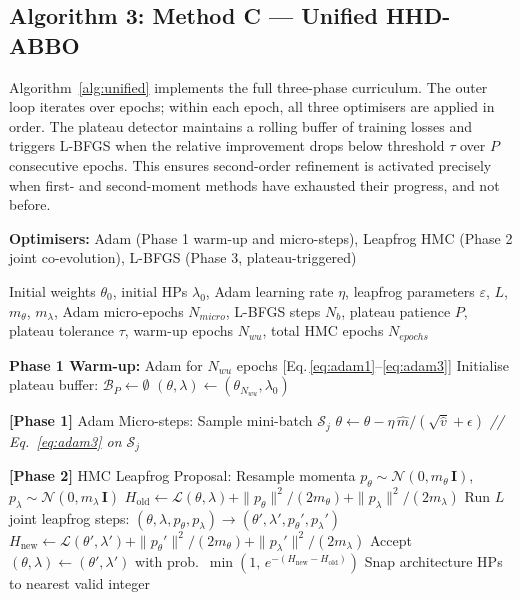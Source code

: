 \documentclass[12pt,a4paper]{article}
\begin{document}
\subsection{Algorithm 3: Method C — Unified HHD-ABBO}

Algorithm~\ref{alg:unified} implements the full three-phase curriculum.
The outer loop iterates over epochs; within each epoch, all three
optimisers are applied in order.  The plateau detector maintains a
rolling buffer of training losses and triggers L-BFGS when the relative
improvement drops below threshold $\tau$ over $P$ consecutive epochs.
This ensures second-order refinement is activated precisely when first-
and second-moment methods have exhausted their progress, and not before.

\begin{algorithm}[tb]
\caption{Method C — Unified HHD-ABBO}
\label{alg:unified}
\textbf{Optimisers:} Adam (Phase 1 warm-up and micro-steps),
Leapfrog HMC (Phase 2 joint co-evolution),
L-BFGS (Phase 3, plateau-triggered)
\begin{algorithmic}[1]
\Require Initial weights $\theta_0$, initial HPs $\lambda_0$,
         Adam learning rate $\eta$,
         leapfrog parameters $\varepsilon$, $L$, $m_\theta$, $m_\lambda$,
         Adam micro-epochs $N_{micro}$,
         L-BFGS steps $N_b$,
         plateau patience $P$,
         plateau tolerance $\tau$,
         warm-up epochs $N_{wu}$,
         total HMC epochs $N_{epochs}$

\State \textbf{Phase 1 Warm-up:} Adam for $N_{wu}$ epochs
       [Eq.\,\eqref{eq:adam1}--\eqref{eq:adam3}]
\State Initialise plateau buffer: $\mathcal{B}_P \leftarrow \emptyset$
\State $(\theta, \lambda) \leftarrow (\theta_{N_{wu}}, \lambda_0)$


  \State \textbf{[Phase 1]} Adam Micro-steps:
    \State Sample mini-batch $\mathcal{S}_j$
    \State $\theta \leftarrow \theta - \eta\,\hat{m} / (\sqrt{\hat{v}}+\epsilon)$
           \hfill \textit{// Eq.\ \eqref{eq:adam3} on $\mathcal{S}_j$}
  \EndFor

  \State \textbf{[Phase 2]} HMC Leapfrog Proposal:
  \State Resample momenta
         $p_\theta \sim \mathcal{N}(0, m_\theta\,\mathbf{I})$,
         $p_\lambda \sim \mathcal{N}(0, m_\lambda\,\mathbf{I})$
  \State $H_{\mathrm{old}} \leftarrow \mathcal{L}(\theta,\lambda)
         + \|p_\theta\|^2/(2m_\theta) + \|p_\lambda\|^2/(2m_\lambda)$
  \State Run $L$ joint leapfrog steps:
         $(\theta,\lambda,p_\theta,p_\lambda) \to
          (\theta',\lambda',p_\theta',p_\lambda')$
  \State $H_{\mathrm{new}} \leftarrow \mathcal{L}(\theta',\lambda')
         + \|p_\theta'\|^2/(2m_\theta) + \|p_\lambda'\|^2/(2m_\lambda)$
  \State Accept $(\theta,\lambda) \leftarrow (\theta',\lambda')$
         with prob.\ $\min(1,\,e^{-(H_{\mathrm{new}}-H_{\mathrm{old}})})$
  \State Snap architecture HPs to nearest valid integer


\end{algorithmic}
\end{algorithm}
\end{document}
